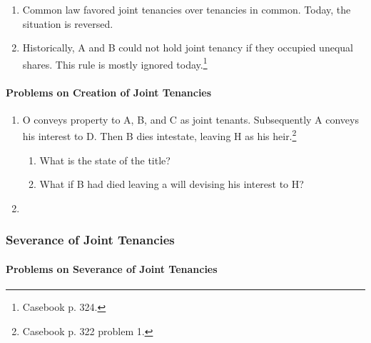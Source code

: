 \begin{enumerate}
\begin{enumerate}
\begin{enumerate}
            a joint tenancy into a tenancy in common by conveying his interest 
            to a third party. 
        \end{enumerate}
        \item \textbf{Tenancy by the entirety}: created only in husband and 
        wife.\footnote{Casebook p. 321.}
        \begin{enumerate}
            \item Requires the four unities, plus a fifth---marriage.
            \item Today it exists in less than half the states.
        \end{enumerate}
    \end{enumerate}
    \item Common law favored joint tenancies over tenancies in common. Today, 
    the situation is reversed.
    \item Historically, A and B could not hold joint tenancy if they occupied 
    unequal shares. This rule is mostly ignored today.\footnote{Casebook p. 
    324.}
\end{enumerate}

\paragraph{Problems on Creation of Joint Tenancies}

\begin{enumerate}
    \item O conveys property to A, B, and C as joint tenants. Subsequently A 
    conveys his interest to D. Then B dies intestate, leaving H as his 
    heir.\footnote{Casebook p. 322 problem 1.}
    \begin{enumerate}
        \item What is the state of the title? %
        \item What if B had died leaving a will devising his interest to H?
    \end{enumerate}
    \item %
\end{enumerate}

\subsubsection{Severance of Joint Tenancies}


\paragraph{Problems on Severance of Joint Tenancies}


